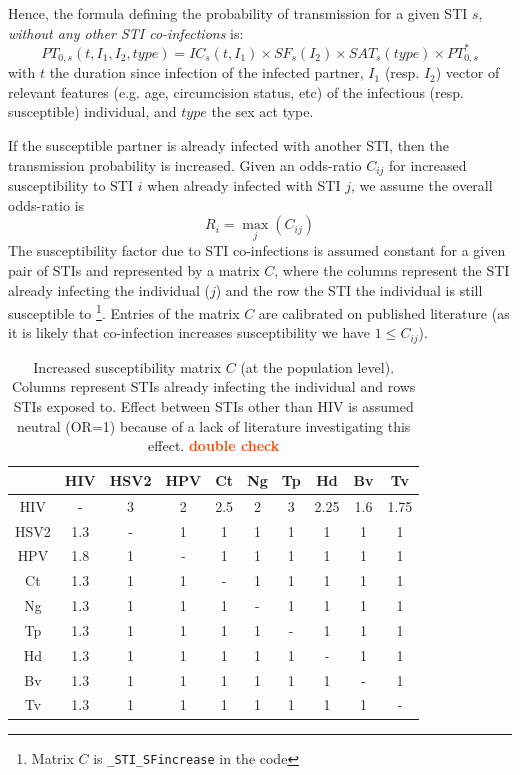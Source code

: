 \documentclass[11pt, onecolumn]{article}
\newcommand{\ttt}[1]{\texttt{#1}}
\newcommand{\warning}[1]{\textbf{\textcolor{OrangeRed}{#1}}}
\begin{document}
Hence, the formula defining the probability of transmission for a given STI $s$, \emph{without any other STI co-infections} is:
$$PT_{0,s}(t,I_1,I_2,type) =  IC_s(t,I_1)\times SF_s(I_2) \times SAT_s(type) \times PT_{0,s}^* $$
with $t$ the duration since infection of the infected partner, $I_1$ (resp. $I_2$) vector of relevant features (e.g. age, circumcision status, etc) of the infectious (resp. susceptible) individual, and $type$ the sex act type.

If the susceptible partner is already infected with another STI, then the transmission probability is increased. Given an odds-ratio $C_{ij}$ for increased susceptibility to STI $i$ when already infected with STI $j$, we assume the overall odds-ratio is
$$R_i = \max_j(C_{ij})$$
The susceptibility factor due to STI co-infections is assumed constant for a given pair of STIs and represented by a matrix $C$, where the columns represent the STI already infecting the individual ($j$) and the row the STI the individual is still susceptible to
\footnote{Matrix $C$ is \ttt{\_STI\_SFincrease} in the code}. 
Entries of the matrix $C$ are calibrated on published literature (as it is likely that co-infection increases susceptibility we have $1\leq C_{ij}$). 

\begin{table}[htdp]
\begin{center}
\begin{tabular}{|c|c|c|c|c|c|c|c|c|c|}
\hline
&HIV&HSV2&HPV&Ct&Ng&Tp&Hd&Bv&Tv\\
\hline
HIV&-&3&2&2.5&2&3&2.25&1.6&1.75\\
HSV2&1.3&-&1&1&1&1&1&1&1\\
HPV&1.8&1&-&1&1&1&1&1&1\\
Ct&1.3&1&1&-&1&1&1&1&1\\
Ng&1.3&1&1&1&-&1&1&1&1\\
Tp&1.3&1&1&1&1&-&1&1&1\\
Hd&1.3&1&1&1&1&1&-&1&1\\
Bv&1.3&1&1&1&1&1&1&-&1\\
Tv&1.3&1&1&1&1&1&1&1&-\\
\hline
\end{tabular}
\end{center}
\caption{Increased susceptibility matrix $C$ (at the population level). Columns represent STIs already infecting the individual and rows STIs exposed to. Effect between STIs other than HIV is assumed neutral (OR=1) because of a lack of literature investigating this effect. \warning{double check}}
\label{default}
\end{table}%
\end{document}
